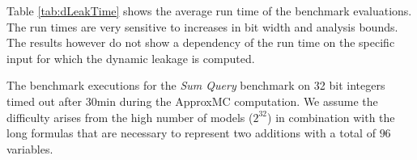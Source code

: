 Table \ref{tab:dLeakTime} shows the average run time of the benchmark evaluations. The run times are very sensitive to increases in bit width and analysis bounds. The results however do not show a dependency of the run time on the specific input for which the dynamic leakage is computed.

The benchmark executions for the \emph{Sum Query} benchmark on 32 bit integers timed out after 30min during the ApproxMC computation. We assume the difficulty arises from the high number of models ($2^32$) in combination with the long formulas that are necessary to represent two additions with a total of $96$ variables.


\begin{table}[]
\end{table}
